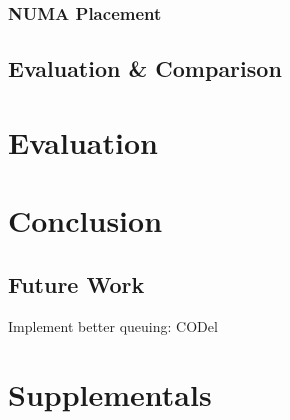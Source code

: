 \documentclass[IN,11pt,twoside,openright,master,english]{tumthesis}
\begin{document}
	\subsection{NUMA Placement}
\section{Evaluation \& Comparison}

\chapter{Evaluation}
\label{chap:evaluation}

\chapter{Conclusion}
\label{chap:conclusion}
\section{Future Work}
	Implement better queuing: CODel

%


\appendix
\chapter{Supplementals}


\printacronyms[heading=chapter,name=List of acronyms]
\clearpage
\pagestyle{thesischapter}

\cleardoublepage
\printbibliography[heading=bibintoc]

\clearpage
\pagestyle{empty}
\end{document}
